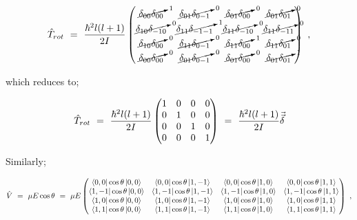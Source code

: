 \documentclass{article}
\begin{document}
\begin{equation} \label{eq:267}
\hat{T}_{rot} \hspace{0.125cm} = \hspace{0.125cm} \frac{\hbar^2 l(l + 1)}{2I} \begin{pmatrix} \cancelto{1}{\delta_{00}\delta_{00}} & \cancelto{0}{\delta_{01}\delta_{0 -1}} & \cancelto{0}{\delta_{01}\delta_{00}} & \cancelto{0}{\delta_{01}\delta_{01}} \\ \cancelto{0}{\delta_{10}\delta_{-1 0}} & \cancelto{1}{\delta_{11}\delta_{-1 -1}} & \cancelto{0}{\delta_{11}\delta_{-10}} & \cancelto{0}{\delta_{11}\delta_{-11}} \\ \cancelto{0}{\delta_{10}\delta_{00}} & \cancelto{0}{\delta_{11}\delta_{0 -1}} & \cancelto{1}{\delta_{11}\delta_{00}} & \cancelto{0}{\delta_{11}\delta_{01}} \\ \cancelto{0}{\delta_{00}\delta_{00}} & \cancelto{0}{\delta_{01}\delta_{0 -1}} & \cancelto{0}{\delta_{01}\delta_{00}} & \cancelto{1}{\delta_{01}\delta_{01}}  \end{pmatrix} \hspace{0.125cm},
\end{equation} 

which reduces to; 

\begin{equation} \label{eq:268}
\hat{T}_{rot} \hspace{0.125cm} = \hspace{0.125cm} \frac{\hbar^2 l(l + 1)}{2I} \begin{pmatrix} 1 & 0 & 0 & 0 \\ 0 & 1 & 0 & 0 \\ 0 & 0 & 1 & 0 \\ 0 & 0 & 0 & 1
\end{pmatrix} \hspace{0.125cm} = \hspace{0.125cm} \frac{\hbar^2 l(l + 1)}{2I}\vec{\vec{\delta}}
\end{equation} 

Similarly; 

\begin{equation} \label{eq:269}
\hat{V} \hspace{0.125cm} = \hspace{0.125cm} \mu E \cos\theta \hspace{0.125cm} = \hspace{0.125cm} \mu E \begin{pmatrix} \bra{0,0}\cos\theta\ket{0,0} & \bra{0,0}\cos\theta\ket{1,-1} & \bra{0,0}\cos\theta\ket{1,0} & \bra{0,0}\cos\theta\ket{1,1} \\ \bra{1,-1}\cos\theta\ket{0,0} & \bra{1,-1}\cos\theta\ket{1,-1} & \bra{1,-1}\cos\theta\ket{1,0} & \bra{1,-1}\cos\theta\ket{1,1} \\ \bra{1,0}\cos\theta\ket{0,0} & \bra{1,0}\cos\theta\ket{1,-1} & \bra{1,0}\cos\theta\ket{1,0} & \bra{1,0}\cos\theta\ket{1,1} \\ \bra{1,1}\cos\theta\ket{0,0} & \bra{1,1}\cos\theta\ket{1,-1} & \bra{1,1}\cos\theta\ket{1,0} & \bra{1,1}\cos\theta\ket{1,1}
\end{pmatrix} \hspace{0.125cm} ,
\end{equation} 
\end{document}

